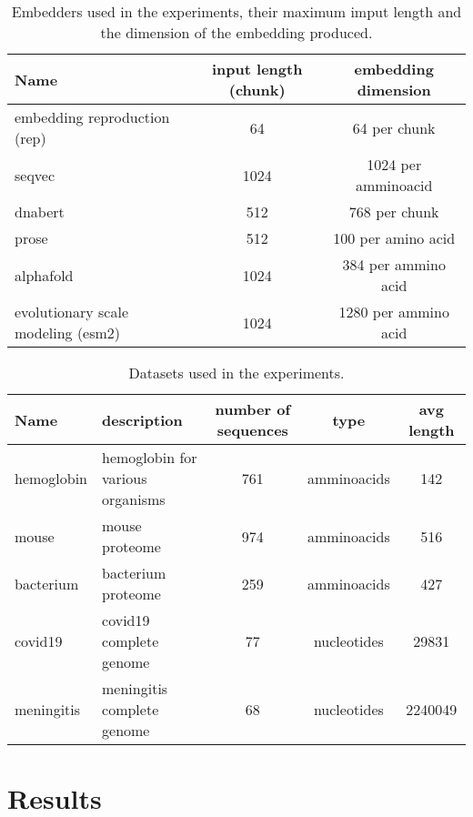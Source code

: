 \documentclass[12pt, letterpaper, twocolumn]{article}
\begin{document}
\onecolumn
\begin{table}[htb]
\centering
\begin{tabular}{|l c c|} 
    \hline
    Name & input length (chunk) & embedding dimension  \\ 
    \hline
    embedding reproduction (rep)\cite{yang2018learned}       & 64    & 64 per chunk   \\
    seqvec \cite{heinzinger2019modeling} & 1024 & 1024 per amminoacid \\
    dnabert \cite{ji2021dnabert}                     & 512     & 768 per chunk \\
    prose   \cite{bepler2021learning}                   & 512   & 100 per amino acid   \\
    alphafold  \cite{jumper2021highly}                 & 1024   & 384 per ammino acid\\
    evolutionary scale modeling (esm2) \cite{lin2022language}   & 1024    & 1280 per ammino acid \\  
    \hline
\end{tabular}
\caption{Embedders used in the experiments, their maximum imput length and the dimension of the embedding produced.}
\label{tab:embedders}
\end{table}
\twocolumn


\onecolumn
\begin{table}[htb]
\centering
\begin{tabular}{|p{3cm} p{3cm} c c c |} 
    \hline
    Name & description & number of sequences & type & avg length   \\ 
    \hline
    hemoglobin &  hemoglobin for various organisms & 761 & amminoacids & 142  \\
    \hline
    mouse & mouse proteome     & 974 & amminoacids & 516 \\
    \hline
    bacterium & bacterium proteome  & 259 &  amminoacids & 427  \\
    \hline
    covid19 & covid19 complete genome & 77 & nucleotides & 29831  \\
    \hline
    meningitis & meningitis complete genome & 68 & nucleotides & 2240049 \\
    \hline
\end{tabular}
\caption{Datasets used in the experiments.}
\label{tab:dataset}
\end{table}
\twocolumn




\section{Results}
\end{document}
